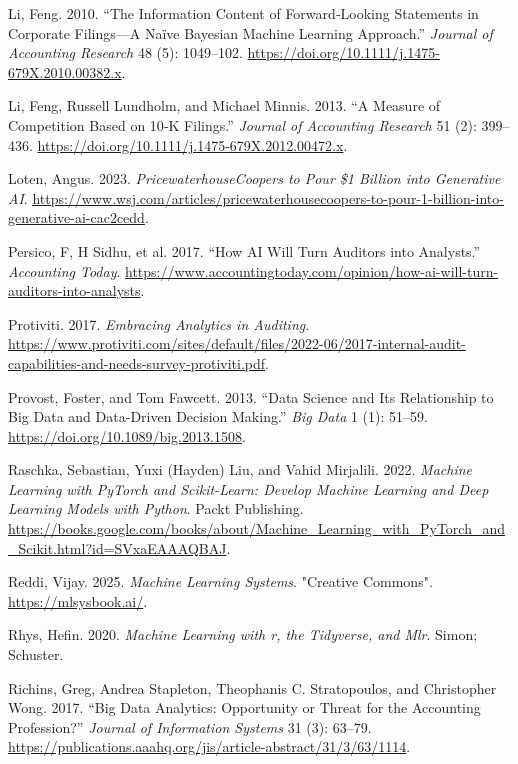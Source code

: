 \documentclass[
  letterpaper,
  DIV=11,
  numbers=noendperiod]{scrreprt}
\newlength{\cslhangindent}
\newenvironment{CSLReferences}[2] %
 {\begin{list}{}{%
  \setlength{\itemindent}{0pt}
  \setlength{\leftmargin}{0pt}
  \setlength{\parsep}{0pt}
  \ifodd #1
   \setlength{\leftmargin}{\cslhangindent}
   \setlength{\itemindent}{-1\cslhangindent}
  \fi
  \setlength{\itemsep}{#2\baselineskip}}}
 {\end{list}}
\begin{document}
\begin{CSLReferences}{1}{1}
Li, Feng. 2010. {``The {Information} {Content} of {Forward}‐{Looking}
{Statements} in {Corporate} {Filings}---{A} {Naïve} {Bayesian} {Machine}
{Learning} {Approach}.''} \emph{Journal of Accounting Research} 48 (5):
1049--102. \url{https://doi.org/10.1111/j.1475-679X.2010.00382.x}.

Li, Feng, Russell Lundholm, and Michael Minnis. 2013. {``A {Measure} of
{Competition} {Based} on 10‐{K} {Filings}.''} \emph{Journal of
Accounting Research} 51 (2): 399--436.
\url{https://doi.org/10.1111/j.1475-679X.2012.00472.x}.

Loten, Angus. 2023. \emph{PricewaterhouseCoopers to Pour \$1 Billion
into Generative AI}.
\url{https://www.wsj.com/articles/pricewaterhousecoopers-to-pour-1-billion-into-generative-ai-cac2cedd}.

{Persico, F, H Sidhu, et al.} 2017. {``How AI Will Turn Auditors into
Analysts.''} \emph{Accounting Today}.
\url{https://www.accountingtoday.com/opinion/how-ai-will-turn-auditors-into-analysts}.

Protiviti. 2017. \emph{Embracing {Analytics} in {Auditing}}.
\url{https://www.protiviti.com/sites/default/files/2022-06/2017-internal-audit-capabilities-and-needs-survey-protiviti.pdf}.

Provost, Foster, and Tom Fawcett. 2013. {``Data {Science} and Its
{Relationship} to {Big} {Data} and {Data}-{Driven} {Decision}
{Making}.''} \emph{Big Data} 1 (1): 51--59.
\url{https://doi.org/10.1089/big.2013.1508}.

Raschka, Sebastian, Yuxi (Hayden) Liu, and Vahid Mirjalili. 2022.
\emph{Machine Learning with PyTorch and Scikit-Learn: Develop Machine
Learning and Deep Learning Models with Python}. Packt Publishing.
\url{https://books.google.com/books/about/Machine_Learning_with_PyTorch_and_Scikit.html?id=SVxaEAAAQBAJ}.

Reddi, Vijay. 2025. \emph{Machine Learning Systems}. "Creative Commons".
\url{https://mlsysbook.ai/}.

Rhys, Hefin. 2020. \emph{Machine Learning with r, the Tidyverse, and
Mlr}. Simon; Schuster.

Richins, Greg, Andrea Stapleton, Theophanis C. Stratopoulos, and
Christopher Wong. 2017. {``Big Data Analytics: Opportunity or Threat for
the Accounting Profession?''} \emph{Journal of Information Systems} 31
(3): 63--79.
\url{https://publications.aaahq.org/jis/article-abstract/31/3/63/1114}.


\end{CSLReferences}
\end{document}
